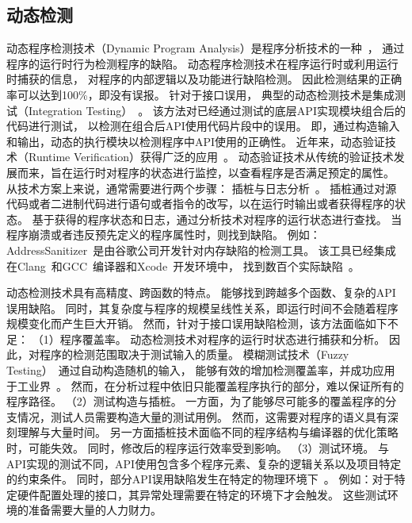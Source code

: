 \subsection{动态检测}
动态程序检测技术（Dynamic Program Analysis）是程序分析技术的一种~\cite{15-pa}，
通过程序的运行时行为检测程序的缺陷。
动态程序检测技术在程序运行时或利用运行时捕获的信息，
对程序的内部逻辑以及功能进行缺陷检测。
因此检测结果的正确率可以达到100\%，即没有误报。
针对于接口误用，
典型的动态检测技术是集成测试（Integration Testing）~\cite{02-icis-integration-testing}。
该方法对已经通过测试的底层API实现模块组合后的代码进行测试，
以检测在组合后API使用代码片段中的误用。
即，通过构造输入和输出，动态的执行模块以检测程序中API使用的正确性。
近年来，动态验证技术（Runtime Verification）获得广泛的应用~\cite{18-rv}。
动态验证技术从传统的验证技术发展而来，旨在运行时对程序的状态进行监控，以查看程序是否满足预定的属性。
从技术方案上来说，通常需要进行两个步骤：
插桩与日志分析~\cite{07-acm-valgrind, 91-purify, 12-atc-AddressSanitizer}。
插桩通过对源代码或者二进制代码进行语句或者指令的改写，以在运行时输出或者获得程序的状态。
基于获得的程序状态和日志，通过分析技术对程序的运行状态进行查找。
当程序崩溃或者违反预先定义的程序属性时，则找到缺陷。
例如：AddressSanitizer~\cite{12-atc-AddressSanitizer}是由谷歌公司开发针对内存缺陷的检测工具。
该工具已经集成在Clang~\cite{clang}和GCC~\cite{gcc}编译器和Xcode~\cite{Xcode}开发环境中，
找到数百个实际缺陷~\cite{AddressSanitizerFoundBugs}。


动态检测技术具有高精度、跨函数的特点。
能够找到跨越多个函数、复杂的API误用缺陷。
同时，其复杂度与程序的规模呈线性关系，即运行时间不会随着程序规模变化而产生巨大开销。
然而，针对于接口误用缺陷检测，该方法面临如下不足：
（1）程序覆盖率。
动态检测技术对程序的运行时状态进行捕获和分析。
因此，对程序的检测范围取决于测试输入的质量。
模糊测试技术（Fuzzy Testing）~\cite{18-fuzz}通过自动构造随机的输入，
能够有效的增加检测覆盖率，并成功应用于工业界~\cite{18-saner-fuzz}。
然而，在分析过程中依旧只能覆盖程序执行的部分，难以保证所有的程序路径。
（2）测试构造与插桩。
一方面，为了能够尽可能多的覆盖程序的分支情况，测试人员需要构造大量的测试用例。
然而，这需要对程序的语义具有深刻理解与大量时间。
另一方面插桩技术面临不同的程序结构与编译器的优化策略时，可能失效。
同时，修改后的程序运行效率受到影响。
（3）测试环境。
与API实现的测试不同，API使用包含多个程序元素、复杂的逻辑关系以及项目特定的约束条件。
同时，部分API误用缺陷发生在特定的物理环境下~\cite{15-kernel-sv}。
例如：对于特定硬件配置处理的接口，其异常处理需要在特定的环境下才会触发。
这些测试环境的准备需要大量的人力财力。

